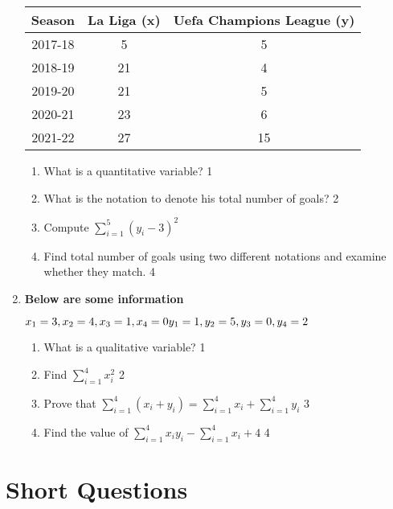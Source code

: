 \documentclass[a4paper,oneside]{book}
\begin{document}
\begin{enumerate}
	  \begin{table}[h]
	  \centering
\begin{tabular}{c|c|c}
Season & La Liga (x) & Uefa Champions League (y) \\ \hline
2017-18 & 5 & 5 \\ 
2018-19 & 21 & 4 \\
2019-20 & 21 & 5 \\
2020-21 & 23 & 6 \\ 
2021-22 & 27 & 15 \\ \hline
\end{tabular}
\end{table}
  
  \begin{enumerate}
    \item
	What is a quantitative variable? \hfill 1
    \item
	What is the notation to denote his total number of goals? \hfill 2
    \item  
	Compute $\displaystyle \sum_{i=1}^5 (y_i - 3)^2$ \hfill 
    \item
	Find total number of goals using two different notations and examine whether they match. \hfill 4
  \end{enumerate}

  
 \item
	  \textbf{Below are some information} 
  
  $x_1=3, x_2=4, x_3=1, x_4=0 \\
	  y_1=1, y_2=5, y_3=0, y_4=2$
  
  \begin{enumerate}
    \item
	What is a qualitative variable? \hfill 1
    \item
	Find $\displaystyle \sum_{i=1}^{4}x_i^2$ \hfill 2
    \item  
	Prove that $\displaystyle \sum_{i=1}^{4} (x_i+y_i) = \sum_{i=1}^{4}x_i + \sum_{i=1}^{4}y_i $ \hfill 3
    \item
	Find the value of $\displaystyle \sum_{i=1}^{4} x_iy_i-\sum_{i=1}^{4} x_i+4$ \hfill 4

  \end{enumerate}
  
  \end{enumerate}

\section{Short Questions}
\end{document}
